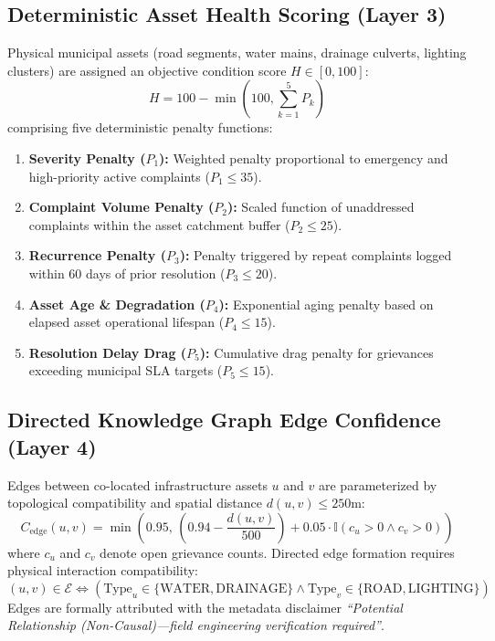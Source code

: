 \documentclass[conference]{IEEEtran}
\begin{document}
\subsection{Deterministic Asset Health Scoring (Layer 3)}
Physical municipal assets (road segments, water mains, drainage culverts, lighting clusters) are assigned an objective condition score $H \in [0, 100]$:
\begin{equation}
H = 100 - \min\left(100, \sum_{k=1}^{5} P_k\right)
\end{equation}
comprising five deterministic penalty functions:
\begin{enumerate}
    \item \textbf{Severity Penalty ($P_1$):} Weighted penalty proportional to emergency and high-priority active complaints ($P_1 \le 35$).
    \item \textbf{Complaint Volume Penalty ($P_2$):} Scaled function of unaddressed complaints within the asset catchment buffer ($P_2 \le 25$).
    \item \textbf{Recurrence Penalty ($P_3$):} Penalty triggered by repeat complaints logged within 60 days of prior resolution ($P_3 \le 20$).
    \item \textbf{Asset Age \& Degradation ($P_4$):} Exponential aging penalty based on elapsed asset operational lifespan ($P_4 \le 15$).
    \item \textbf{Resolution Delay Drag ($P_5$):} Cumulative drag penalty for grievances exceeding municipal SLA targets ($P_5 \le 15$).
\end{enumerate}

\subsection{Directed Knowledge Graph Edge Confidence (Layer 4)}
Edges between co-located infrastructure assets $u$ and $v$ are parameterized by topological compatibility and spatial distance $d(u, v) \le 250\text{m}$:
\begin{equation}
C_{\text{edge}}(u, v) = \min\left(0.95, \, \left(0.94 - \frac{d(u,v)}{500}\right) + 0.05 \cdot \mathbb{I}(c_u > 0 \land c_v > 0)\right)
\end{equation}
where $c_u$ and $c_v$ denote open grievance counts. Directed edge formation requires physical interaction compatibility:
\begin{equation}
(u, v) \in \mathcal{E} \iff (\text{Type}_u \in \{\text{WATER}, \text{DRAINAGE}\} \land \text{Type}_v \in \{\text{ROAD}, \text{LIGHTING}\})
\end{equation}
Edges are formally attributed with the metadata disclaimer \textit{``Potential Relationship (Non-Causal)---field engineering verification required''}.
\end{document}
